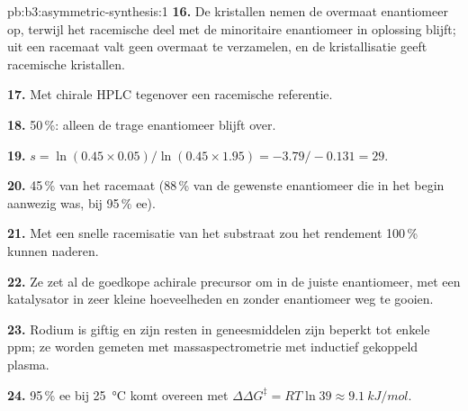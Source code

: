 \begin{solution}{pb:b3:asymmetric-synthesis:1}
\textbf{16.} De kristallen nemen de overmaat enantiomeer op, terwijl het
racemische deel met de minoritaire enantiomeer in oplossing blijft; uit
een racemaat valt geen overmaat te verzamelen, en de kristallisatie geeft
racemische kristallen.

\textbf{17.} Met chirale HPLC tegenover een racemische referentie.

\textbf{18.} 50\,\%: alleen de trage enantiomeer blijft over.

\textbf{19.} $s = \ln(0.45 \times 0.05)/\ln(0.45 \times 1.95) = -3.79/-0.131 = 29$.

\textbf{20.} 45\,\% van het racemaat (88\,\% van de gewenste enantiomeer die
in het begin aanwezig was, bij 95\,\% ee).

\textbf{21.} Met een snelle racemisatie van het substraat zou het rendement
100\,\% kunnen naderen.

\textbf{22.} Ze zet al de goedkope achirale precursor om in de juiste
enantiomeer, met een katalysator in zeer kleine hoeveelheden en zonder
enantiomeer weg te gooien.

\textbf{23.} Rodium is giftig en zijn resten in geneesmiddelen zijn beperkt
tot enkele ppm; ze worden gemeten met massaspectrometrie met inductief
gekoppeld plasma.

\textbf{24.} 95\,\% ee bij \qty{25}{\celsius} komt overeen met $\Delta\Delta G^\ddagger = RT\ln 39 \approx \qty{9.1}{kJ/mol}$.
\end{solution}
